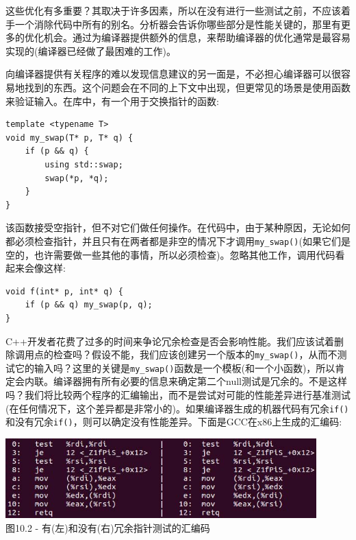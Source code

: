 这些优化有多重要？其取决于许多因素，所以在没有进行一些测试之前，不应该着手一个消除代码中所有的别名。分析器会告诉你哪些部分是性能关键的，那里有更多的优化机会。通过为编译器提供额外的信息，来帮助编译器的优化通常是最容易实现的(编译器已经做了最困难的工作)。 

向编译器提供有关程序的难以发现信息建议的另一面是，不必担心编译器可以很容易地找到的东西。这个问题会在不同的上下文中出现，但更常见的场景是使用函数来验证输入。在库中，有一个用于交换指针的函数:

\begin{lstlisting}[style=styleCXX]
template <typename T>
void my_swap(T* p, T* q) {
	if (p && q) {
		using std::swap;
		swap(*p, *q);
	}
}
\end{lstlisting}

该函数接受空指针，但不对它们做任何操作。在代码中，由于某种原因，无论如何都必须检查指针，并且只有在两者都是非空的情况下才调用\texttt{my\_swap()}(如果它们是空的，也许需要做一些其他的事情，所以必须检查)。忽略其他工作，调用代码看起来会像这样:

\begin{lstlisting}[style=styleCXX]
void f(int* p, int* q) {
	if (p && q) my_swap(p, q);
}
\end{lstlisting}

C++开发者花费了过多的时间来争论冗余检查是否会影响性能。我们应该试着删除调用点的检查吗？假设不能，我们应该创建另一个版本的\texttt{my\_swap()}，从而不测试它的输入吗？这里的关键是\texttt{my\_swap()}函数是一个模板(和一个小函数)，所以肯定会内联。编译器拥有所有必要的信息来确定第二个null测试是冗余的。不是这样吗？我们将比较两个程序的汇编输出，而不是尝试对可能的性能差异进行基准测试(在任何情况下，这个差异都是非常小的)。如果编译器生成的机器代码有冗余\texttt{if()}和没有冗余\texttt{if()}，则可以确定没有性能差异。下面是GCC在x86上生成的汇编码:

\begin{center}
\includegraphics[width=0.9\textwidth]{content/3/chapter10/images/2.jpg}\\
图10.2 - 有(左)和没有(右)冗余指针测试的汇编码
\end{center}

